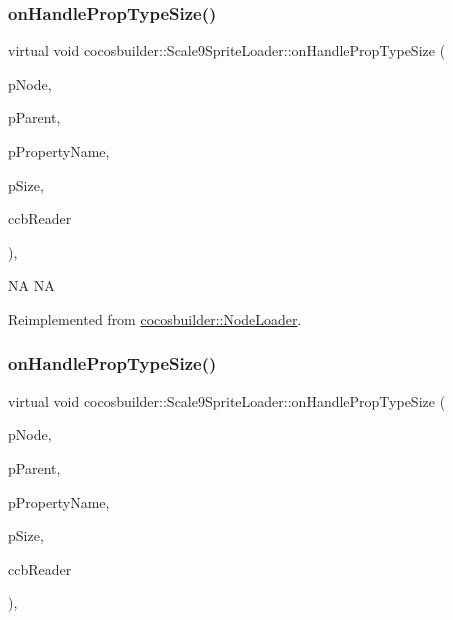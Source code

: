 \subsubsection{\texorpdfstring{on\+Handle\+Prop\+Type\+Size()}{onHandlePropTypeSize()}\hspace{0.1cm}{\footnotesize\ttfamily [1/2]}}
{\footnotesize\ttfamily virtual void cocosbuilder\+::\+Scale9\+Sprite\+Loader\+::on\+Handle\+Prop\+Type\+Size (\begin{DoxyParamCaption}\item[{cocos2d\+::\+Node $\ast$}]{p\+Node,  }\item[{cocos2d\+::\+Node $\ast$}]{p\+Parent,  }\item[{const char $\ast$}]{p\+Property\+Name,  }\item[{cocos2d\+::\+Size}]{p\+Size,  }\item[{\hyperlink{classcocosbuilder_1_1CCBReader}{C\+C\+B\+Reader} $\ast$}]{ccb\+Reader }\end{DoxyParamCaption})\hspace{0.3cm}{\ttfamily [protected]}, {\ttfamily [virtual]}}

NA  NA 

Reimplemented from \hyperlink{classcocosbuilder_1_1NodeLoader}{cocosbuilder\+::\+Node\+Loader}.

\mbox{\label{classcocosbuilder_1_1Scale9SpriteLoader_a749f9f634d680b8005a3ca9c86873bc9}} 
\subsubsection{\texorpdfstring{on\+Handle\+Prop\+Type\+Size()}{onHandlePropTypeSize()}\hspace{0.1cm}{\footnotesize\ttfamily [2/2]}}
{\footnotesize\ttfamily virtual void cocosbuilder\+::\+Scale9\+Sprite\+Loader\+::on\+Handle\+Prop\+Type\+Size (\begin{DoxyParamCaption}\item[{cocos2d\+::\+Node $\ast$}]{p\+Node,  }\item[{cocos2d\+::\+Node $\ast$}]{p\+Parent,  }\item[{const char $\ast$}]{p\+Property\+Name,  }\item[{cocos2d\+::\+Size}]{p\+Size,  }\item[{\hyperlink{classcocosbuilder_1_1CCBReader}{C\+C\+B\+Reader} $\ast$}]{ccb\+Reader }\end{DoxyParamCaption})\hspace{0.3cm}{\ttfamily [protected]}, {\ttfamily [virtual]}}

